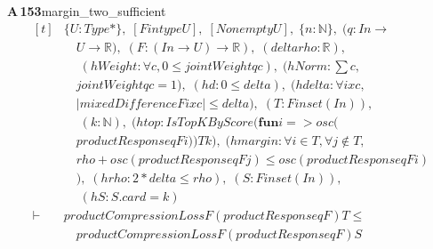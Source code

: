 \documentclass[conference]{IEEEtran}
\theoremstyle{definition}
\newcommand{\lean}[1]{\textsf{\footnotesize #1}}
\begin{document}
\noindent\textbf{A\,153}\quad\lean{margin\_two\_sufficient}
{\footnotesize\[ \begin{aligned}[t]
&\{ \mathit{U} : \mathit{Type}*\},\; [\mathit{Fintype} \mathit{U}],\; [\mathit{Nonempty} \mathit{U}],\; \{ \mathit{n} : \mathbb{N} \},\; (\mathit{q} : \mathit{I} \mathit{n} \to\\
&\quad \mathit{U} \to \mathbb{R} ),\; (\mathit{F} : (\mathit{I} \mathit{n} \to \mathit{U}) \to \mathbb{R} ),\; (\mathit{delta} \mathit{rho} : \mathbb{R} ),\\
&\quad \; (\mathit{hWeight} : \forall \mathit{c},0 \leq \mathit{jointWeight} \mathit{q} \mathit{c}),\; (\mathit{hNorm} : \textstyle\sum \mathit{c},\\
&\quad \mathit{jointWeight} \mathit{q} \mathit{c}=1),\; (\mathit{hd} : 0 \leq \mathit{delta}),\; (\mathit{hdelta} : \forall \mathit{i} \mathit{x} \mathit{c},\\
&\quad |\mathit{mixedDifference} \mathit{F} \mathit{i} \mathit{x} \mathit{c}| \leq \mathit{delta}),\; (\mathit{T} : \mathit{Finset} (\mathit{I} \mathit{n})),\\
&\quad \; (\mathit{k} : \mathbb{N} ),\; (\mathit{htop} : \mathit{IsTopKByScore} (\mathbf{fun} \mathit{i} => \mathit{osc} (\\
&\quad \mathit{productResponse} \mathit{q} \mathit{F} \mathit{i})) \mathit{T} \mathit{k}),\; (\mathit{hmargin} : \forall \mathit{i} \in \mathit{T},\forall \mathit{j} \notin \mathit{T},\\
&\quad \mathit{rho}+\mathit{osc} (\mathit{productResponse} \mathit{q} \mathit{F} \mathit{j}) \leq \mathit{osc} (\mathit{productResponse} \mathit{q} \mathit{F} \mathit{i})\\
&\quad ),\; (\mathit{hrho} : 2*\mathit{delta} \leq \mathit{rho}),\; (\mathit{S} : \mathit{Finset} (\mathit{I} \mathit{n})),\\
&\quad \; (\mathit{hS} : \mathit{S}.\mathit{card}=\mathit{k})\\
\vdash\;&\mathit{productCompressionLoss} \mathit{F} (\mathit{productResponse} \mathit{q} \mathit{F}) \mathit{T} \leq\\
&\quad \mathit{productCompressionLoss} \mathit{F} (\mathit{productResponse} \mathit{q} \mathit{F}) \mathit{S}
\end{aligned} \]}
\end{document}
